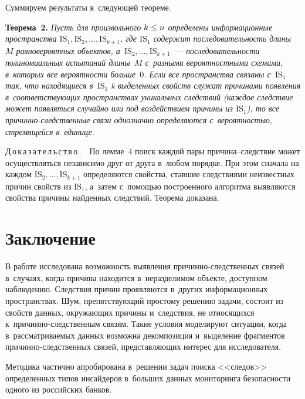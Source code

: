 \begin{multicols}{2}
  \smallskip
  
  Суммируем результаты в~следующей теореме.
  
  \smallskip
  
  \noindent
  \textbf{Теорема~2.} \textit{Пусть для произвольного $k\hm\leq n$ определены 
информационные пространства $\mathrm{IS}_1, \mathrm{IS}_2, \ldots, 
\mathrm{IS}_{k+1}$, где $\mathrm{IS}_1$ содержит последовательность длины~$M$ 
равновероятных объектов, а~$\mathrm{IS}_2, \ldots , \mathrm{IS}_{k+1}$~--- 
последовательности полиномиальных испытаний длины~$M$ с~разными 
вероятностными схемами, в~которых все вероятности больше~$0$. Если все 
пространства связаны с~$\mathrm{IS}_1$ так, что находящиеся в~$\mathrm{IS}_1$ k выделенных 
свойств служат причинами появления в~соответствующих пространствах 
уникальных следствий (каждое следствие может появляться случайно или под 
воздействием причины из $\mathrm{IS}_1$), то все при\-чин\-но-след\-ст\-вен\-ные связи 
однозначно определяются с~вероятностью, стремящейся к~единице}.
  
  \smallskip
  
  \noindent
  Д\,о\,к\,а\,з\,а\,т\,е\,л\,ь\,с\,т\,в\,о\,.\ \  По лемме~4 поиск каждой пары  
при\-чи\-на--след\-ст\-вие может осуществляться независимо друг от друга 
в~любом порядке. При этом сначала на  каждом $\mathrm{IS}_2, \ldots , 
\mathrm{IS}_{k+1}$ определяются свойства, ставшие следствиями неизвестных 
причин свойств из IS$_1$, а~затем  с~по\-мощью построенного алгоритма 
выявляются свойства причины найденных следствий. Теорема доказана.

\vspace*{-9pt}
  
  \section{Заключение }
  
  В работе исследована возможность выявления причинно-следственных связей 
  в~случаях, когда причина находится в~неразделимом объекте, доступном 
наблюдению. Следствия причин проявляются в~других информационных 
пространствах. Шум, препятствующий простому решению задачи, состоит из 
свойств данных, окру\-жа\-ющих причины и~следствия, не относящихся  
к~при\-чин\-но-след\-ст\-вен\-ным связям. Такие условия моделируют ситуации, 
когда в~рассматриваемых данных возможна декомпозиция и~выделение 
фрагментов при\-чин\-но-след\-ст\-вен\-ных связей, пред\-став\-ля\-ющих интерес для 
исследователя.
  
  Методика частично апробирована в~решении задач поиска <<следов>> 
определенных типов инсайдеров в~больших данных мониторинга безопас\-ности 
одного из российских банков. 


\end{multicols}
